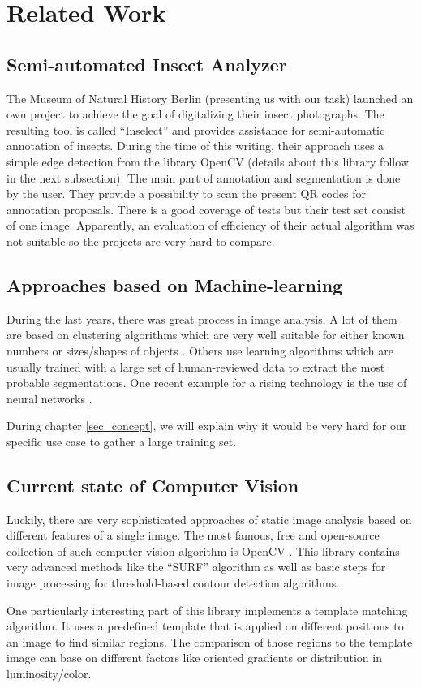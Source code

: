 %
\section{Related Work}
\label{sec_related}

\subsection{Semi-automated Insect Analyzer}

The Museum of Natural History Berlin (presenting us with our task) launched an own project to achieve the goal of digitalizing their insect photographs. 
The resulting tool is called ``Inselect'' \cite{Inselect} and provides assistance for semi-automatic annotation of insects. 
During the time of this writing, their approach uses a simple edge detection from the library OpenCV (details about this library follow in the next subsection).
The main part of annotation and segmentation is done by the user. 
They provide a possibility to scan the present QR codes for annotation proposals.
There is a good coverage of tests but their test set consist of one image. 
Apparently, an evaluation of efficiency of their actual algorithm was not suitable so the projects are very hard to compare.

\subsection{Approaches based on Machine-learning}

During the last years, there was great process in image analysis. 
A lot of them are based on clustering algorithms which are very well suitable for either known numbers or sizes/shapes of objects \cite{Pappas}. 
Others use learning algorithms which are usually trained with a large set of human-reviewed data to extract the most probable segmentations.
One recent example for a rising technology is the use of neural networks \cite{turagal}.

During chapter \ref{sec_concept}, we will explain why it would be very hard for our specific use case to gather a large training set.

\subsection{Current state of Computer Vision}

Luckily, there are very sophisticated approaches of static image analysis based on different features of a single image.
The most famous, free and open-source collection of such computer vision algorithm is OpenCV \cite{opencv_library}. 
This library contains very advanced methods like the ``SURF'' algorithm as well as basic steps for image processing for threshold-based contour detection algorithms.

One particularly interesting part of this library implements a template matching algorithm. 
It uses a predefined template that is applied on different positions to an image to find similar regions.
The comparison of those regions to the template image can base on different factors like oriented gradients or distribution in luminosity/color.